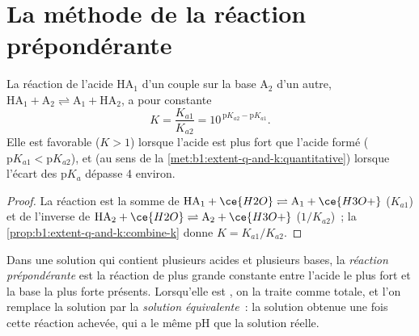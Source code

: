 \clearpage
\section{La méthode de la réaction prépondérante}

\begin{proposition}\label{prop:b1:predominant-reaction:k-of-reaction}
La réaction de l'acide $\mathrm{HA}_1$ d'un couple sur la base
$\mathrm{A}_2$ d'un autre,
$\mathrm{HA}_1 + \mathrm{A}_2 \rightleftharpoons \mathrm{A}_1 + \mathrm{HA}_2$,
a pour constante
\[
  K = \frac{K_{a1}}{K_{a2}} = 10^{\,\mathrm{p}K_{a2} - \mathrm{p}K_{a1}} .
\]
Elle est favorable ($K > 1$) lorsque l'acide est plus fort que l'acide
formé ($\mathrm{p}K_{a1} < \mathrm{p}K_{a2}$), et  (au sens
de la \cref{met:b1:extent-q-and-k:quantitative}) lorsque l'écart des
$\mathrm{p}K_a$ dépasse 4 environ.
\end{proposition}

\begin{proof}
La réaction est la somme de $\mathrm{HA}_1 + \ce{H2O} \rightleftharpoons
\mathrm{A}_1 + \ce{H3O+}$ ($K_{a1}$) et de l'inverse de $\mathrm{HA}_2 +
\ce{H2O} \rightleftharpoons \mathrm{A}_2 + \ce{H3O+}$ ($1/K_{a2}$)~;
la \cref{prop:b1:extent-q-and-k:combine-k} donne $K = K_{a1}/K_{a2}$.
\end{proof}

\begin{definition}\label{def:b1:predominant-reaction:predominant-reaction}
Dans une solution qui contient plusieurs acides et plusieurs bases, la
\emph{réaction prépondérante} est la réaction de plus grande
constante entre l'acide le plus fort et la base la plus forte présents.
Lorsqu'elle est , on la traite comme totale, et l'on
remplace la solution par la \emph{solution équivalente}~: la
solution obtenue une fois cette réaction achevée, qui a le même pH que
la solution réelle.
\end{definition}

